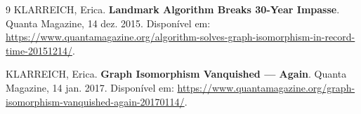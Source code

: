 \documentclass[12pt]{article}
\begin{document}
    \divisoria
    
    \begingroup\raggedright
        \begin{thebibliography}{9}
            KLARREICH, Erica. \textbf{Landmark Algorithm Breaks 30-Year Impasse}. Quanta Magazine, 14 dez. 2015.
            Disponível em: \url{https://www.quantamagazine.org/algorithm-solves-graph-isomorphism-in-record-time-20151214/}.

            KLARREICH, Erica. \textbf{Graph Isomorphism Vanquished --- Again}. Quanta Magazine, 14 jan. 2017.
            Disponível em: \url{https://www.quantamagazine.org/graph-isomorphism-vanquished-again-20170114/}.
        \end{thebibliography}
    \endgroup
\end{document}
